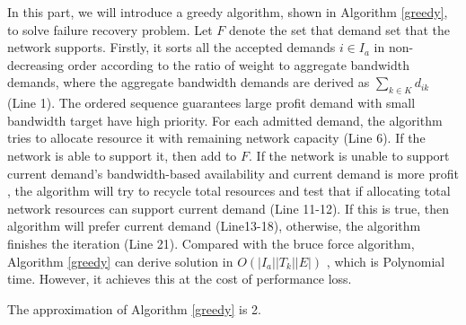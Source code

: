 \documentclass[sigconf]{acmart}
\begin{document}
\begin{appendices}
 In this part, we will introduce a greedy algorithm, shown in Algorithm \ref{greedy}, to solve failure recovery problem.
 Let $F$ denote the set that demand set that the network supports.
Firstly, it sorts all the accepted demands  $i\in I_a$ in non-decreasing order according to the ratio of weight to aggregate bandwidth demands, where the aggregate bandwidth demands are derived as ${\sum_{k\in K}d_{ik}}$ (Line 1).
The ordered sequence guarantees large profit demand with small bandwidth target have high priority.
For each admitted demand, the algorithm tries to allocate resource it with remaining network capacity (Line 6).
If the network is able to support it, then add to $F$.
If the network is unable to support current demand's  bandwidth-based availability and current demand is more profit ,  the algorithm will try to recycle total resources and test that if allocating total network resources can support current demand  (Line 11-12).
If this is true, then algorithm will prefer current demand  (Line13-18), otherwise, the algorithm finishes the iteration (Line 21).
%
Compared with the bruce force algorithm, Algorithm \ref{greedy} can derive solution in $O(|I_a||T_k||E|)$ , which is Polynomial time.
However, it achieves this at the cost of performance loss.
\begin{lemma}\label{greedy-app}
The approximation of Algorithm \ref{greedy} is 2.
\end{lemma}


\end{appendices}
\end{document}

